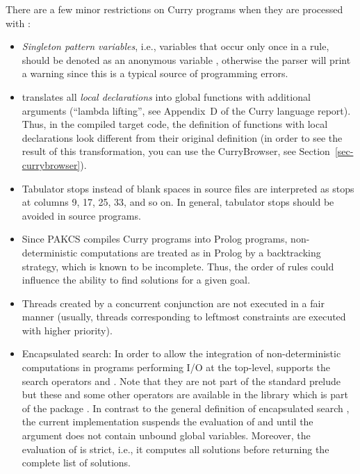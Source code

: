 There are a few minor restrictions on Curry programs
when they are processed with \CYS:
\begin{itemize}
\item
{}
\emph{Singleton pattern variables}, i.e., variables that occur only once
in a rule, should be denoted as an anonymous variable \ccode{_},
otherwise the parser will print a warning since this is a
typical source of programming errors.
\item
\CYS translates all \emph{local declarations} into global functions with
additional arguments (``lambda lifting'', see Appendix~D of the
Curry language report).
Thus, in the compiled target code, the definition of
functions with local declarations look different from
their original definition (in order to see the result
of this transformation, you can use the CurryBrowser, see
Section~\ref{sec-currybrowser}).
\item {}
Tabulator stops instead of blank spaces in source files are
interpreted as stops at columns 9, 17, 25, 33, and so on.
In general, tabulator stops should be avoided in source programs.
\item
Since PAKCS compiles Curry programs into Prolog programs,
non-deterministic computations are treated as in Prolog
by a backtracking strategy, which is known to be incomplete.
Thus, the order of rules could influence the ability
to find solutions for a given goal.
\item
Threads created by a concurrent conjunction are not executed
in a fair manner (usually, threads corresponding to leftmost constraints
are executed with higher priority).
\item
Encapsulated search: In order
to allow the integration of non-deterministic computations
in programs performing I/O at the top-level, \CYS supports
the search operators 
and .
Note that they are not part of the standard prelude
but these and some other operators are available in the
library  which is part of the package .
In contrast to the general definition of encapsulated search
\cite{HanusSteiner98PLILP}, the current implementation suspends
the evaluation of  and 
until the argument does not contain unbound global variables.
Moreover, the evaluation of  is strict,
i.e., it computes all solutions before returning the
complete list of solutions.


\end{itemize}
